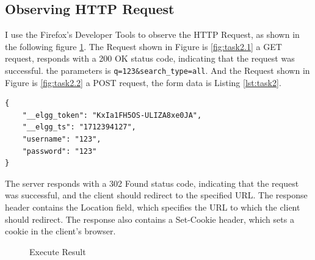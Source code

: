 \documentclass[a4paper,11pt]{article}
\begin{document}
\subsection{Observing HTTP Request}

I use the Firefox's Developer Tools to observe the HTTP Request, as shown in the following figure \ref{fig:task2}. The Request shown in Figure is \ref{fig:task2.1} a GET request, responds with a 200 OK status code, indicating that the request was successful. the parameters is \verb|q=123&search_type=all|. And the Request shown in Figure is \ref{fig:task2.2} a POST request, the form data is Listing \ref{lst:task2}.
\begin{lstlisting}[caption={POST parameters},label={lst:task2},language=XML,breaklines=true]
{
	"__elgg_token": "KxIa1FH5OS-ULIZA8xe0JA",
	"__elgg_ts": "1712394127",
	"username": "123",
	"password": "123"
}
\end{lstlisting}
The server responds with a 302 Found status code, indicating that the request was successful, and the client should redirect to the specified URL. The response header contains the Location field, which specifies the URL to which the client should redirect. The response also contains a Set-Cookie header, which sets a cookie in the client's browser.

\begin{figure}[h]
    \centering
    \hfill
    \hfill
    \caption{Execute Result}\label{fig:task2}
\end{figure}
\end{document}
